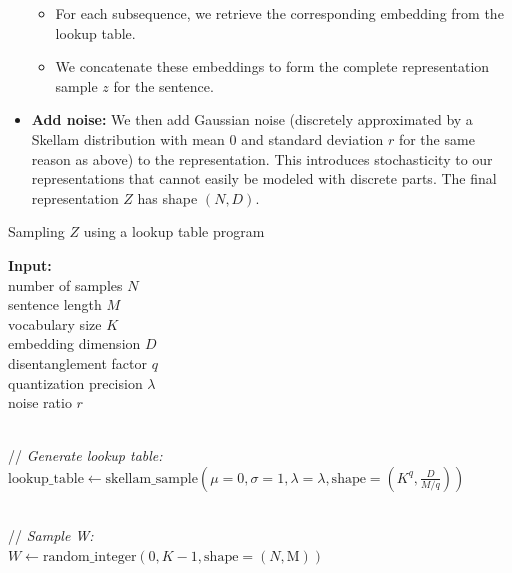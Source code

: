 \documentclass{article} %
\begin{document}
\begin{appendices}
\begin{itemize}
\begin{itemize}
        \item For each subsequence, we retrieve the corresponding embedding from the lookup table.
        
        \item We concatenate these embeddings to form the complete representation sample $z$ for the sentence.
    \end{itemize}
    
    \item \textbf{Add noise:}
    We then add Gaussian noise (discretely approximated by a Skellam distribution with mean 0 and standard deviation $r$ for the same reason as above) to the representation. This introduces stochasticity to our representations that cannot easily be modeled with discrete parts. The final representation $Z$ has shape $(N, D)$.
\end{itemize}

\begin{algorithm}
\caption{Sampling $Z$ using a lookup table program}
\label{alg:lookup_table}
\begin{algorithmic}
\item \textbf{Input:}
\\ \hspace{1em} number of samples $N$
\\ \hspace{1em} sentence length $M$
\\ \hspace{1em} vocabulary size $K$
\\ \hspace{1em} embedding dimension $D$
\\ \hspace{1em} disentanglement factor $q$
\\ \hspace{1em} quantization precision $\lambda$
\\ \hspace{1em} noise ratio $r$

\item 
\\ // \textit{Generate lookup table:}
\\ $\text{lookup\_table} \leftarrow \text{skellam\_sample}(\mu=0, \sigma=1, \lambda=\lambda, \text{shape}=(K^q, \frac{D}{M / q}))$

\item 
\\ // \textit{Sample W:}
\\ $W \leftarrow \text{random\_integer}(0, K-1, \text{shape}=(N, \text{M}))$


\end{algorithmic}
\end{algorithm}
\end{appendices}
\end{document}

